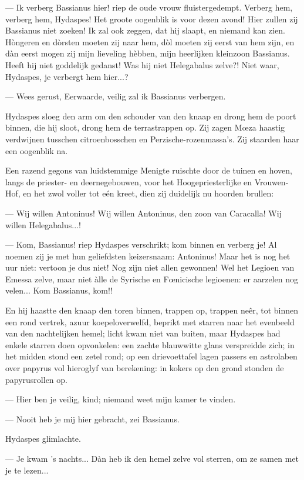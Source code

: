\documentclass[a4paper, 12pt, oneside, dutch]{article}
\begin{document}
--- Ik verberg Bassianus hier! riep de oude vrouw fluistergedempt. Verberg hem, verberg hem, Hydaspes! Het groote oogenblik is voor dezen avond! Hier zullen zij Bassianus niet zoeken! Ik zal ook zeggen, dat hij slaapt, en niemand kan zien. Hòngeren en dòrsten moeten zij naar hem, dòl moeten zij eerst van hem zijn, en dàn eerst mogen zij mijn lieveling hèbben, mijn heerlijken kleinzoon Bassianus. Heeft hij niet goddelijk gedanst! Was hij niet Helegabalus zelve?! Niet waar, Hydaspes, je verbergt hem hier...?

--- Wees gerust, Eerwaarde, veilig zal ik Bassianus verbergen.

Hydaspes sloeg den arm om den schouder van den knaap en drong hem de poort binnen, die hij sloot, drong hem de terrastrappen op. Zij zagen Mœza haastig verdwijnen tusschen citroenbosschen en Perzische-rozenmassa's. Zij staarden haar een oogenblik na.

Een razend gegons van luidstemmige Menigte ruischte door de tuinen en hoven, langs de priester- en deernegebouwen, voor het Hoogepriesterlijke en Vrouwen-Hof, en het zwol voller tot eén kreet, dien zij duidelijk nu hoorden brullen:

--- Wij willen Antoninus! Wij willen Antoninus, den zoon van Caracalla! Wij willen Helegabalus...!

--- Kom, Bassianus! riep Hydaspes verschrikt; kom binnen en verberg je! Al noemen zij je met hun geliefdsten keizersnaam: Antoninus! Maar het is nog het uur niet: vertoon je dus niet! Nog zijn niet allen gewonnen! Wel het Legioen van Emessa zelve, maar niet àlle de Syrische en Fœnicische legioenen: er aarzelen nog velen... Kom Bassianus, kom!!

En hij haastte den knaap den toren binnen, trappen op, trappen neêr, tot binnen een rond vertrek, azuur koepeloverwelfd, beprikt met starren naar het evenbeeld van den nachtelijken hemel; licht kwam niet van buiten, maar Hydaspes had enkele starren doen opvonkelen: een zachte blauwwitte glans verspreidde zich; in het midden stond een zetel rond; op een drievoettafel lagen passers en astrolaben over papyrus vol hieroglyf van berekening: in kokers op den grond stonden de papyrusrollen op.

--- Hier ben je veilig, kind; niemand weet mijn kamer te vinden.

--- Nooit heb je mij hier gebracht, zei Bassianus.

Hydaspes glimlachte.

--- Je kwam 's nachts... Dàn heb ik den hemel zelve vol sterren, om ze samen met je te lezen...
\end{document}
